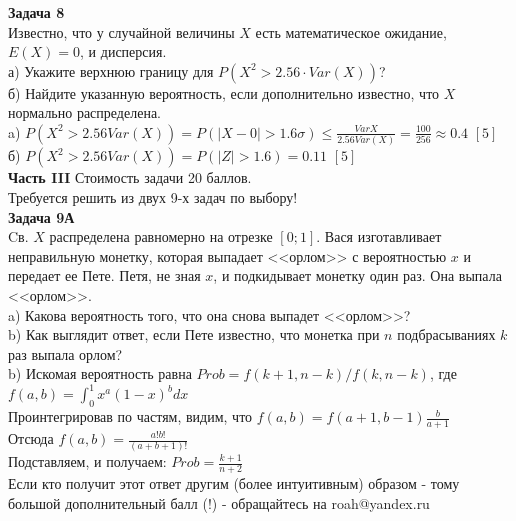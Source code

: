 \documentclass[pdftex,12pt,a4paper]{article}
\begin{document}
\textbf{Задача 8} \\ %
Известно, что у случайной величины $X$ есть
математическое
ожидание, $E(X)=0$, и дисперсия. \\
а) Укажите верхнюю границу для $P(X^{2}>2.56\cdot Var(X))$? \\%
б) Найдите указанную вероятность, если дополнительно известно, что
$X$ нормально распределена. \\%
a) $P(X^{2}>2.56Var(X))=P(|X-0|>1.6\sigma)\le
\frac{Var{X}}{2.56Var(X)}=\frac{100}{256}\approx 0.4$ $[5]$\\
б) $P(X^{2}>2.56Var(X))=P(|Z|>1.6)=0.11$ $[5]$\\

\textbf{Часть III} Стоимость задачи 20 баллов. \\
Требуется решить \textbf{} из двух 9-х задач по
выбору! \\

\textbf{Задача 9А} \\
Cв.  $X$ распределена равномерно на отрезке $[0;1]$. Вася изготавливает неправильную монетку, которая выпадает <<орлом>> с вероятностью  $x$ и передает ее Пете.
Петя, не зная $x$, и подкидывает монетку один раз. Она выпала
<<орлом>>. \\
a) Какова вероятность того, что она снова выпадет
<<орлом>>? \\
b) Как выглядит ответ, если Пете известно, что монетка при
$n$ подбрасываниях  $k$  раз выпала орлом? \\

b) Искомая вероятность равна $Prob=f(k+1,n-k)/f(k,n-k)$, где \\
$f(a,b)=\int_{0}^{1}x^{a}(1-x)^{b}dx$ \\
Проинтегрировав по частям, видим, что $f(a,b)=f(a+1,b-1)\frac{b}{a+1}$ \\
Отсюда $f(a,b)=\frac{a!b!}{(a+b+1)!}$ \\
Подставляем, и получаем: $Prob=\frac{k+1}{n+2}$ \\
Если кто получит этот ответ другим (более интуитивным) образом - тому большой дополнительный балл (!) - обращайтесь на roah@yandex.ru \\
\end{document}
